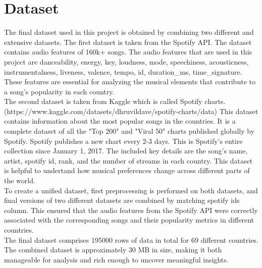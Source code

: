 \section{Dataset}
The final dataset used in this project is obtained by combining two different and extensive datasets.
The first dataset is taken from the Spotify API. The dataset contains audio features of 160k+ songs. The audio features
that are used in this project are danceability, energy, key, loudness, mode, speechiness, acousticness, instrumentalness,
liveness, valence, tempo, id, duration_ms, time_signature.  These features are essential for analyzing the musical 
elements that contribute to a song's popularity in each country.\\
The second dataset is taken from Kaggle which is called Spotify charts. (https://www.kaggle.com/datasets/dhruvildave/spotify-charts/data)
This dataset contains information about the most popular songs in the countries. It is a complete dataset 
of all the "Top 200" and "Viral 50" charts published globally by Spotify. Spotify publishes a new chart
 every 2-3 days. This is Spotify's entire collection since January 1, 2017.
 The included key details are the song's name, artist, spotify id, rank, and the number of streams 
 in each country. This dataset is helpful to undertand how musical preferences change across different
 parts of the world. \\
 To create a unified dataset, first preprocessing is performed on both datasets, and final versions of two different 
 datasets are combined by matching spotify ids column. This ensured that the audio features from the Spotify API were 
 correctly associated with the corresponding songs and their popularity metrics in different countries.\\
 The final dataset comprises 195000 rows of data in total for 69 different countries. The combined
 dataset is approximately 30 MB in size, making it both manageable for analysis and rich enough to uncover 
 meaningful insights.\\